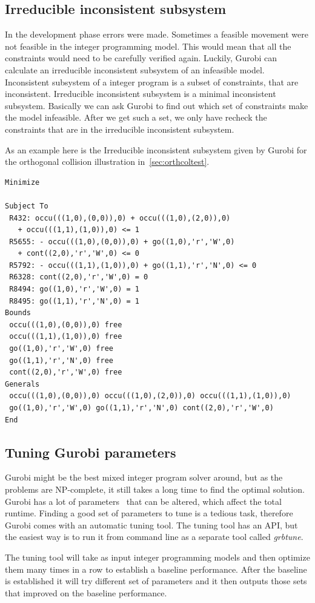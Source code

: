 \subsection{Irreducible inconsistent subsystem}
In the development phase errors were made. Sometimes a feasible movement were
not feasible in the integer programming model. This would mean that all the
constraints would need to be carefully verified again. Luckily, Gurobi can
calculate an irreducible inconsistent subsystem of an infeasible model.
Inconsistent subsystem of a integer program is a subset of constraints, that
are inconsistent. Irreducible inconsistent subsystem is a minimal
inconsistent subsystem. Basically we can ask Gurobi to find out which set of
constraints make the model infeasible. After we get such a set, we only have
recheck the constraints that are in the irreducible inconsistent subsystem.

As an example here is the Irreducible inconsistent subsystem given by Gurobi
for the orthogonal collision illustration in~\autoref{sec:orthcoltest}.
\begin{verbatim}
Minimize
 
Subject To
 R432: occu(((1,0),(0,0)),0) + occu(((1,0),(2,0)),0)
   + occu(((1,1),(1,0)),0) <= 1
 R5655: - occu(((1,0),(0,0)),0) + go((1,0),'r','W',0)
   + cont((2,0),'r','W',0) <= 0
 R5792: - occu(((1,1),(1,0)),0) + go((1,1),'r','N',0) <= 0
 R6328: cont((2,0),'r','W',0) = 0
 R8494: go((1,0),'r','W',0) = 1
 R8495: go((1,1),'r','N',0) = 1
Bounds
 occu(((1,0),(0,0)),0) free
 occu(((1,1),(1,0)),0) free
 go((1,0),'r','W',0) free
 go((1,1),'r','N',0) free
 cont((2,0),'r','W',0) free
Generals
 occu(((1,0),(0,0)),0) occu(((1,0),(2,0)),0) occu(((1,1),(1,0)),0)
 go((1,0),'r','W',0) go((1,1),'r','N',0) cont((2,0),'r','W',0)
End
\end{verbatim}
\subsection{Tuning Gurobi parameters}
Gurobi might be the best mixed integer program solver around, but as the
problems are NP-complete, it still takes a long time to find the optimal
solution. Gurobi has a lot of parameters~\cite{gurobiparams} that can be
altered, which affect the total runtime. Finding a good set of parameters to
tune is a tedious task, therefore Gurobi comes with an automatic tuning tool.
The tuning tool has an API, but the easiest way is to run it from command line
as a separate tool called \textit{grbtune}.

The tuning tool will take as input integer programming models and then optimize
them many times in a row to establish a baseline performance. After the
baseline is established it will try different set of parameters and it then
outputs those sets that improved on the baseline performance.

